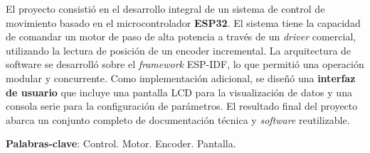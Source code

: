 %
%


\begin{center}
\imprimirtitulo
\end{center}

\begin{resumo}

\noindent El proyecto consistió en el desarrollo integral de un sistema de control de movimiento basado en el microcontrolador \textbf{ESP32}. El sistema tiene la capacidad de comandar un motor de paso de alta potencia a través de un \textit{driver} comercial, utilizando la lectura de posición de un encoder incremental. La arquitectura de software se desarrolló sobre el \textit{framework} ESP-IDF, lo que permitió una operación modular y concurrente. Como implementación adicional, se diseñó una \textbf{interfaz de usuario} que incluye una pantalla LCD para la visualización de datos y una consola serie para la configuración de parámetros. El resultado final del proyecto abarca un conjunto completo de documentación técnica y \textit{software} reutilizable.

\textbf{Palabras-clave}: Control. Motor. Encoder. Pantalla.

\end{resumo}
